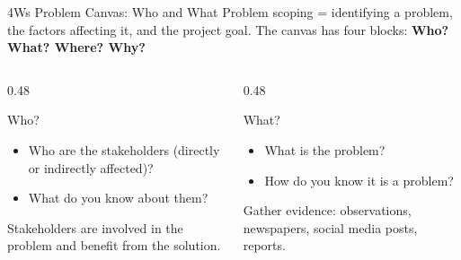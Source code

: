 \documentclass[aspectratio=169,11pt]{beamer}
\begin{document}
\begin{frame}{4Ws Problem Canvas: Who and What}
  Problem scoping = identifying a problem, the factors affecting it, and the project goal. The canvas has four blocks: \textbf{Who? What? Where? Why?}
  \vspace{0.4em}
  \begin{columns}[T]
    \begin{column}{0.48\textwidth}
      \begin{block}{Who?}
        \begin{itemize}
          \item Who are the stakeholders (directly or indirectly affected)?
          \item What do you know about them?
        \end{itemize}
        Stakeholders are involved in the problem and benefit from the solution.
      \end{block}
    \end{column}
    \begin{column}{0.48\textwidth}
      \begin{block}{What?}
        \begin{itemize}
          \item What is the problem?
          \item How do you know it is a problem?
        \end{itemize}
        Gather evidence: observations, newspapers, social media posts, reports.
      \end{block}
    \end{column}
  \end{columns}
\end{frame}
\end{document}
